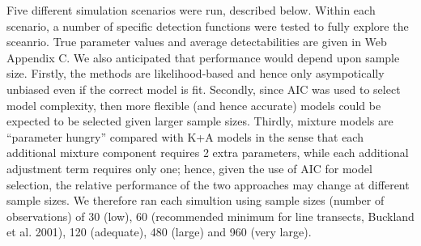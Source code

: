 \documentclass[useAMS,referee]{biom}
\begin{document}
Five different simulation scenarios were run, described below.  Within each scenario, a number of specific detection functions were tested to fully explore the sceanrio.  True parameter values and average detectabilities are given in Web Appendix C.  We also anticipated that performance would depend upon sample size. Firstly, the methods are likelihood-based and hence only asympotically unbiased even if the correct model is fit. Secondly, since AIC was used to select model complexity, then more flexible (and hence accurate) models could be expected to be selected given larger sample sizes.  Thirdly, mixture models are ``parameter hungry'' compared with K+A models in the sense that each additional mixture component requires 2 extra parameters, while each additional adjustment term requires only one; hence, given the use of AIC for model selection, the relative performance of the two approaches may change at different sample sizes.  We therefore ran each simultion using sample sizes (number of observations) of 30 (low), 60 (recommended minimum for line transects, Buckland et al. 2001), 120 (adequate), 480 (large) and 960 (very large).
\end{document}
